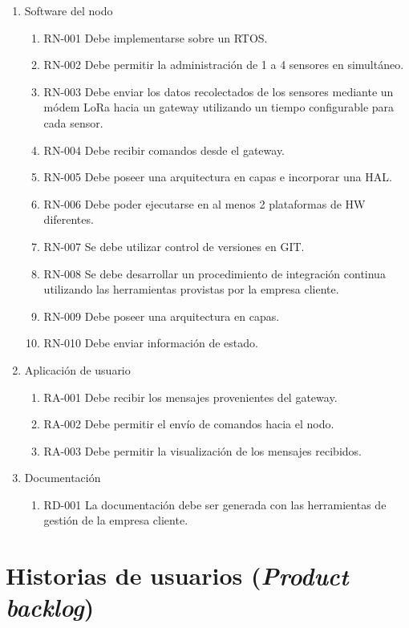 \documentclass[11pt]{charter}
\begin{document}
\begin{enumerate}
\item Software del nodo
	\begin{enumerate}
	\item RN-001 Debe implementarse sobre un RTOS.
	\item RN-002 Debe permitir la administración de 1 a 4 sensores en simultáneo.
	\item RN-003 Debe enviar los datos recolectados de los sensores mediante un módem LoRa hacia un gateway utilizando un tiempo configurable para cada sensor.
	\item RN-004 Debe recibir comandos desde el gateway.
	\item RN-005 Debe poseer una arquitectura en capas e incorporar una HAL.
	\item RN-006 Debe poder ejecutarse en al menos 2 plataformas de HW diferentes.
	\item RN-007 Se debe utilizar control de versiones en GIT.
	\item RN-008 Se debe desarrollar un procedimiento de integración continua utilizando las herramientas provistas por la empresa cliente.
	\item RN-009 Debe poseer una arquitectura en capas.
	\item RN-010 Debe enviar información de estado.
	\end{enumerate}
\item Aplicación de usuario
	\begin{enumerate}
	\item RA-001 Debe recibir los mensajes provenientes del gateway.
	\item RA-002 Debe permitir el envío de comandos hacia el nodo.
	\item RA-003 Debe permitir la visualización de los mensajes recibidos.
	\end{enumerate}
\item Documentación
	\begin{enumerate}
	\item RD-001 La documentación debe ser generada con las herramientas de gestión de la empresa cliente.
	\end{enumerate}
\end{enumerate}

\section{Historias de usuarios (\textit{Product backlog})}
\label{sec:backlog}
\end{document}

